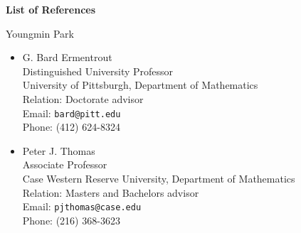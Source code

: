 \documentclass[a4paper,11pt]{article}
\begin{document}
\begin{center}
\Large \textbf{List of References}

\Large Youngmin Park
\end{center}

\begin{itemize}
 \item G. Bard Ermentrout\\
 Distinguished University Professor\\
 University of Pittsburgh, Department of Mathematics\\
 Relation: Doctorate advisor\\
 Email: \texttt{bard@pitt.edu}\\
 Phone: (412) 624-8324
  \item Peter J. Thomas\\
 Associate Professor\\
 Case Western Reserve University, Department of Mathematics\\
 Relation: Masters and Bachelors advisor\\
 Email: \texttt{pjthomas@case.edu}\\
 Phone: (216) 368-3623
 \end{itemize}
\end{document}
